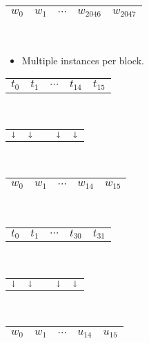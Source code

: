 \begin{frame}
\begin{center}
{\begin{minipage}{0.45\textwidth}
\begin{tabular}{|C{0.59cm}|C{0.59cm}|C{0.59cm}|C{0.59cm}|C{0.59cm}|}
        \hline
        $w_0$ & $w_1$ & $\cdots$ & $w_{2046}$ & $w_{2047}$\\
        \hline
      \end{tabular}\\
    \end{minipage}
  }
\end{center}
  \pause
  \begin{itemize}
  \item Multiple instances per block.
  \end{itemize}\vspace*{-0.4em}
  \begin{center}
  {\tiny
  \begin{minipage}{0.45\textwidth}
    \centering
      \begin{tabular}{C{0.6cm}C{0.6cm}C{0.6cm}C{0.6cm}C{0.6cm}}
        $t_0$ & $t_1$ & $\cdots$ & $t_{14}$ & $t_{15}$ \\
      \end{tabular}\\[-0.5ex]
      \begin{tabular}{C{0.6cm}C{0.6cm}C{0.6cm}C{0.6cm}C{0.6cm}}
        $\shortdownarrow$ & $\shortdownarrow$ & & $\shortdownarrow$ & $\shortdownarrow$ \\
      \end{tabular}\\[-0.5ex]
      \begin{tabular}{|C{0.59cm}|C{0.59cm}|C{0.59cm}|C{0.59cm}|C{0.59cm}|}
        \hline
        $w_0$ & $w_1$ & $\cdots$ & $w_{14}$ & $w_{15}$\\
        \hline
      \end{tabular}\\
    \end{minipage}\qquad
  \begin{minipage}{0.45\textwidth}
    \centering
      \begin{tabular}{C{0.6cm}C{0.6cm}C{0.6cm}C{0.6cm}C{0.6cm}}
        $t_0$ & $t_1$ & $\cdots$ & $t_{30}$ & $t_{31}$ \\
      \end{tabular}\\[-0.5ex]
      \begin{tabular}{C{0.6cm}C{0.6cm}C{0.6cm}C{0.6cm}C{0.6cm}}
        $\shortdownarrow$ & $\shortdownarrow$ & & $\shortdownarrow$ & $\shortdownarrow$ \\
      \end{tabular}\\[-0.5ex]
      \begin{tabular}{|C{0.59cm}|C{0.59cm}|C{0.59cm}|C{0.59cm}|C{0.59cm}|}
        \hline
        $w_0$ & $w_1$ & $\cdots$ & $u_{14}$ & $u_{15}$\\
        \hline
      \end{tabular}\\
    \end{minipage}
  }
  \end{center}
\end{frame}




